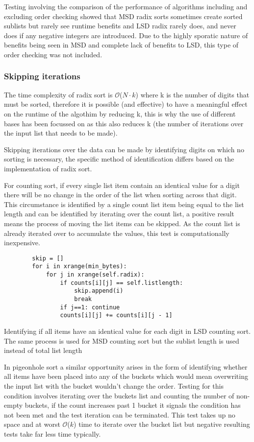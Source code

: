 \documentclass[12pt]{article}
\begin{document}
\par
Testing involving the comparison of the performance of algorithms including and excluding order checking showed that MSD radix sorts sometimes create sorted sublists but rarely see runtime benefits and LSD radix rarely does, and never does if any negative integers are introduced. Due to the highly sporatic nature of benefits being seen in MSD and complete lack of benefits to LSD, this type of order checking was not included.


\pagebreak
\subsubsection{Skipping iterations}
\label{sssec:skip}
The time complexity of radix sort is $\mathcal{O}${($N \cdot k$)} where k is the number of digits that must be sorted, therefore it is possible (and effective) to have a meaningful effect on the runtime of the algothim by reducing k, this is why the use of different bases has been focussed on as this also reduces k (the number of iterations over the input list that needs to be made).
\par
Skipping iterations over the data can be made by identifying digits on which no sorting is necessary, the specific method of identification differs based on the implementation of radix sort.
\par
For counting sort, if every single list item contain an identical value for a digit there will be no change in the order of the list when sorting across that digit. This circumstance is identified by a single count list item being equal to the list length and can be identified by iterating over the count list, a positive result means the process of moving the list items can be skipped. As the count list is already iterated over to accumulate the values, this test is computationally inexpensive.
\begin{table}[H]
	\centering
	\begin{lstlisting}
		skip = []
		for i in xrange(min_bytes):
			for j in xrange(self.radix):
				if counts[i][j] == self.listlength:
					skip.append(i)
					break
				if j==1: continue
				counts[i][j] += counts[i][j - 1]
	\end{lstlisting}
	\caption*{Identifying if all items have an identical value for each digit in LSD counting sort. \\ The same process is used for MSD counting sort but the sublist length is used instead of total list length}
\end{table}
\par
In pigeonhole sort a similar opportunity arises in the form of identifying whether all items have been placed into any of the buckets which would mean overwriting the input list with the bucket wouldn't change the order. Testing for this condition involves iterating over the buckets list and counting the number of non-empty buckets, if the count increases past 1 bucket it signals the condition has not been met and the test iteration can be terminated. This test takes up no space and at worst $\mathcal{O}${($k$)} time to iterate over the bucket list but negative resulting tests take far less time typically.
\end{document}
